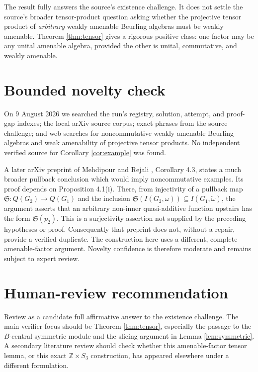 \documentclass[11pt]{article}
\newcommand{\Z}{\mathbb Z}
\begin{document}
The result fully answers the source's existence challenge.  It does not settle
the source's broader tensor-product question asking whether the projective
tensor product of \emph{arbitrary} weakly amenable Beurling algebras must be
weakly amenable.  Theorem \ref{thm:tensor} gives a rigorous positive class:
one factor may be any unital amenable algebra, provided the other is unital,
commutative, and weakly amenable.

\section{Bounded novelty check}

On 9 August 2026 we searched the run's registry, solution, attempt, and
proof-gap indexes; the local arXiv source corpus; exact phrases from the
source challenge; and web searches for noncommutative weakly amenable
Beurling algebras and weak amenability of projective tensor products.  No
independent verified source for Corollary \ref{cor:example} was found.

A later arXiv preprint of Mehdipour and Rejali \cite{MR}, Corollary 4.3,
states a much broader pullback conclusion which would imply noncommutative
examples.  Its proof depends on Proposition 4.1(i).  There, from injectivity
of a pullback map $\mathfrak S:Q(G_2)\to Q(G_1)$ and the inclusion
$\mathfrak S(I(G_2,\omega))\subseteq I(G_1,\overleftarrow\omega)$, the
argument asserts that an arbitrary non-inner quasi-additive function upstairs
has the form $\mathfrak S(p_2)$.  This is a surjectivity assertion not supplied
by the preceding hypotheses or proof.  Consequently that preprint does not,
without a repair, provide a verified duplicate.  The construction here uses
a different, complete amenable-factor argument.  Novelty confidence is
therefore moderate and remains subject to expert review.

\section{Human-review recommendation}

Review as a candidate full affirmative answer to the existence challenge.
The main verifier focus should be Theorem \ref{thm:tensor}, especially the
passage to the $B$-central symmetric module and the slicing argument in Lemma
\ref{lem:symmetric}.  A secondary literature review should check whether this
amenable-factor tensor lemma, or this exact $\Z\times S_3$ construction, has
appeared elsewhere under a different formulation.
\end{document}
